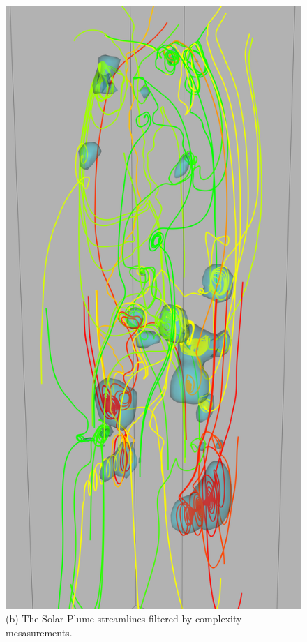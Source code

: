 \documentclass{egpubl}
\begin{document}
\begin{figure}[h]
\begin{minipage}{0.47\linewidth}
                \end{minipage}
                \begin{minipage}{0.47\linewidth}
                        \includegraphics[height = 2\linewidth]{Images/plume_iso_crop.png}\\(b) The Solar Plume streamlines filtered by complexity mesasurements. \vspace{0.2em}

\end{minipage}
\end{figure}
\end{document}
